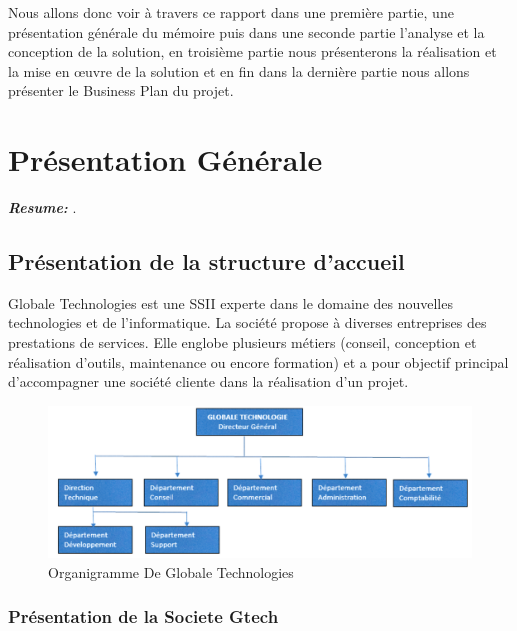 \documentclass[a4paper, 12pt]{report}
\begin{document}
\noindent Nous allons donc voir à travers ce rapport dans une première partie, une présentation générale du mémoire puis dans une seconde partie l'analyse et la conception de la solution, en troisième partie nous présenterons la réalisation et la mise en œuvre de la solution et en fin dans la dernière partie nous allons présenter le Business Plan du projet.


\chapter{Présentation Générale}
\textit{\textbf{Resume:} }.
\setcounter{minitocdepth}{2}
\minitoc
\section{Présentation de la structure d'accueil}
\noindent Globale Technologies est une SSII experte dans le domaine des nouvelles technologies et de l'informatique. La société propose à diverses entreprises des prestations de services. Elle englobe plusieurs métiers (conseil, conception et réalisation d'outils, maintenance ou encore formation) et a pour objectif principal d'accompagner une société cliente dans la réalisation d'un projet.

\begin{figure}
	\centering
	\includegraphics{img/organigramme}
	\caption{Organigramme De Globale Technologies}
	\label{Tux}
\end{figure}
\subsection{Présentation de la Societe Gtech}
\end{document}
